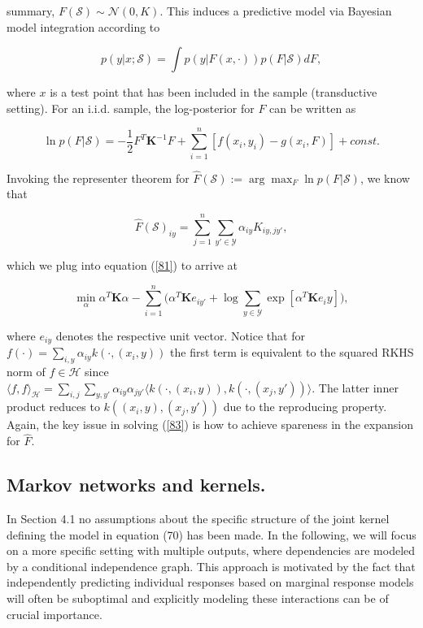 \documentclass[leqno, a4paper,12pt]{article}
\begin{document}
\noindent summary, $F(\mathcal{S}) \sim \mathcal{N}(0,K)$. This induces a predictive model via Bayesian model integration according to

\begin{equation}
\label{80}
p(y|x;\mathcal{S}) = \int p(y|F(x,\cdot))p(F|\mathcal{S})dF,
\end{equation}

\noindent where $x$ is a test point that has been included in the sample (transductive setting). 
For an i.i.d. sample, the log-posterior for $F$ can be written as

\begin{equation}
\label{81}
\ln p(F|\mathcal{S}) = - \frac{1}{2}F^T \boldsymbol{K}^{-1} F + \sum_{i=1}^{n}[f(x_i,y_i)-g(x_i,F)] + const.
\end{equation}

\noindent Invoking the representer theorem for $\hat{F}(\mathcal{S}) := \arg\max _F\ln p(F|\mathcal{S})$, we know
that

\begin{equation}
\label{82}
\hat{F}(\mathcal{S})_{iy} = \sum_{j=1}^{n}\sum_{y'\in \mathcal{Y}} \alpha_{iy} K_{iy,jy'},
\end{equation}

\noindent which we plug into equation (\ref{81}) to arrive at

\begin{equation}
\label{83}
\min\limits_\alpha \alpha^T \boldsymbol{K}\alpha - \sum_{i=1}^{n}\bigg(\alpha^T \boldsymbol{K}e_{iy'}+\log \sum_{y \in \mathcal{Y}} \exp[\alpha^T \boldsymbol{K}e_iy]\bigg),
\end{equation}

\noindent where $e_{iy}$ denotes the respective unit vector. Notice that for 
$ f(\cdot) = \sum_{i,y} \alpha_{iy} k(\cdot,(x_i,y)) $
the first term is equivalent to the squared RKHS norm of $f \in \mathcal{H} $ since \\
$ \langle f,f \rangle _\mathcal{H} = \sum_{i,j} \sum_{y,y'} \alpha_{iy} \alpha_{jy'} \langle k(\cdot,(x_i,y)),k(\cdot,(x_j,y'))\rangle $.
The latter inner product reduces to $ k((x_i,y),(x_j,y')) $
due to the reproducing property. Again, the
key issue in solving (\ref{83}) is how to achieve spareness in the expansion for $\hat{F}$.

\subsection{Markov networks and kernels.} In Section 4.1 no assumptions about 
the specific structure of the joint kernel defining the model in equation 
(70) has been made. In the following, we will focus on a more specific
setting with multiple outputs, where dependencies are modeled by a
conditional independence graph. This approach is motivated by the fact
that independently predicting individual responses based on marginal
response models will often be suboptimal and explicitly modeling these 
interactions can be of crucial importance.
\end{document}

